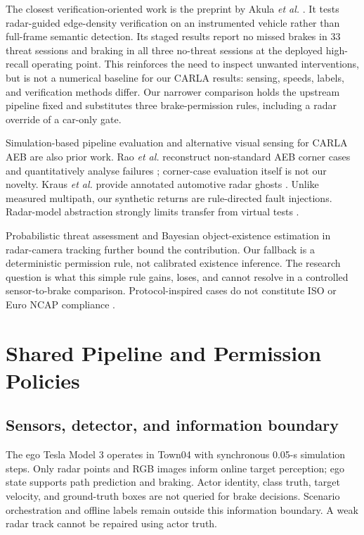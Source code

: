 \documentclass[conference]{IEEEtran}
\begin{document}
The closest verification-oriented work is the preprint by Akula \emph{et al.}
\cite{akula2026radarguided}. It tests radar-guided edge-density verification on
an instrumented vehicle rather than full-frame semantic detection. Its staged
results report no missed brakes in 33 threat sessions and braking in all three
no-threat sessions at the deployed high-recall operating point. This reinforces
the need to inspect unwanted interventions, but is not a numerical baseline for
our CARLA results: sensing, speeds, labels, and verification methods differ.
Our narrower comparison holds the upstream pipeline fixed and substitutes
three brake-permission rules, including a radar override of a car-only gate.

Simulation-based pipeline evaluation \cite{gomez2022carla} and alternative
visual sensing for CARLA AEB \cite{feng2025dvs} are also prior work. Rao
\emph{et al.} reconstruct non-standard AEB corner cases and quantitatively
analyse failures \cite{rao2024corner}; corner-case evaluation itself is not our
novelty. Kraus \emph{et al.} provide annotated automotive radar ghosts
\cite{kraus2021ghost}. Unlike measured multipath, our synthetic returns are
rule-directed fault injections. Radar-model abstraction strongly limits
transfer from virtual tests \cite{magosi2022radar}.

Probabilistic threat assessment \cite{sandblom2011threat} and Bayesian
object-existence estimation in radar-camera tracking
\cite{lindenmaier2022existence} further bound the contribution. Our fallback is
a deterministic permission rule, not calibrated existence inference. The
research question is what this simple rule gains, loses, and cannot resolve in
a controlled sensor-to-brake comparison. Protocol-inspired cases do not
constitute ISO or Euro NCAP compliance \cite{iso15623,euroncap_aeb}.

\section{Shared Pipeline and Permission Policies}
\subsection{Sensors, detector, and information boundary}
The ego Tesla Model 3 operates in Town04 with synchronous 0.05-s simulation
steps. Only radar points and RGB images inform online target perception;
ego state supports path prediction and braking. Actor identity, class truth,
target velocity, and ground-truth boxes are not queried for brake decisions.
Scenario orchestration and offline labels remain outside this information
boundary. A weak radar track cannot be repaired using actor truth.
\end{document}
